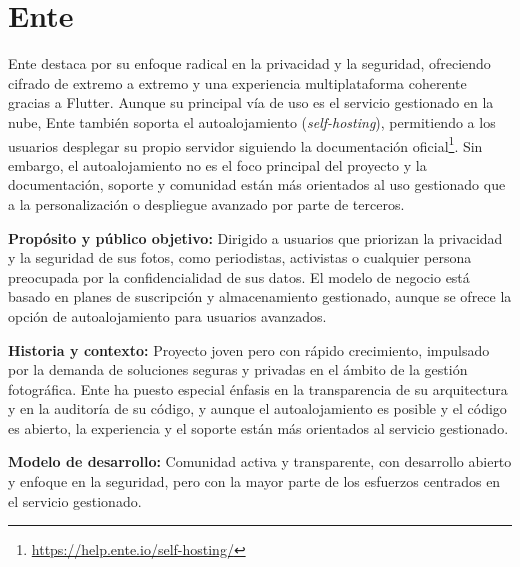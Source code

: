
\section{Ente}

Ente destaca por su enfoque radical en la privacidad y la seguridad, ofreciendo cifrado de extremo a extremo y una experiencia multiplataforma coherente gracias a Flutter. Aunque su principal vía de uso es el servicio gestionado en la nube, Ente también soporta el autoalojamiento (\textit{self-hosting}), permitiendo a los usuarios desplegar su propio servidor siguiendo la documentación oficial\footnote{\url{https://help.ente.io/self-hosting/}}. Sin embargo, el autoalojamiento no es el foco principal del proyecto y la documentación, soporte y comunidad están más orientados al uso gestionado que a la personalización o despliegue avanzado por parte de terceros.

\textbf{Propósito y público objetivo:} Dirigido a usuarios que priorizan la privacidad y la seguridad de sus fotos, como periodistas, activistas o cualquier persona preocupada por la confidencialidad de sus datos. El modelo de negocio está basado en planes de suscripción y almacenamiento gestionado, aunque se ofrece la opción de autoalojamiento para usuarios avanzados.

\textbf{Historia y contexto:} Proyecto joven pero con rápido crecimiento, impulsado por la demanda de soluciones seguras y privadas en el ámbito de la gestión fotográfica. Ente ha puesto especial énfasis en la transparencia de su arquitectura y en la auditoría de su código, y aunque el autoalojamiento es posible y el código es abierto, la experiencia y el soporte están más orientados al servicio gestionado.

\textbf{Modelo de desarrollo:} Comunidad activa y transparente, con desarrollo abierto y enfoque en la seguridad, pero con la mayor parte de los esfuerzos centrados en el servicio gestionado.

